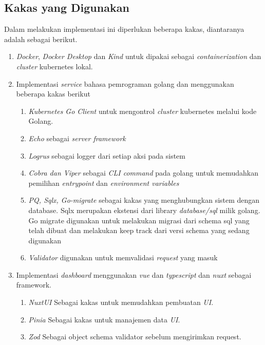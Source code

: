 \subsection{Kakas yang Digunakan}
Dalam melakukan implementasi ini diperlukan beberapa kakas, diantaranya adalah sebagai berikut.
\begin{enumerate}
  \item \textit{Docker}, \textit{Docker Desktop} dan \textit{Kind} untuk dipakai sebagai \textit{containerization} dan \textit{cluster} kubernetes lokal.
  \item Implementasi \textit{service} bahasa pemrograman golang dan menggunakan beberapa kakas berikut
        \begin{enumerate}
          \item \textit{Kubernetes Go Client} untuk mengontrol \textit{cluster} kubernetes melalui kode Golang.
          \item \textit{Echo} sebagai \textit{server framework}
          \item \textit{Logrus} sebagai logger dari setiap aksi pada sistem
          \item \textit{Cobra dan Viper} sebagai \textit{CLI command} pada golang untuk memudahkan pemilihan \textit{entrypoint} dan \textit{environment variables}
          \item \textit{PQ, Sqlx, Go-migrate} sebagai kakas yang menghubungkan sistem dengan database. Sqlx merupakan ekstensi dari library \textit{database/sql} milik golang. Go migrate digunakan untuk melakukan migrasi dari schema sql yang telah dibuat dan melakukan keep track dari versi schema yang sedang digunakan
          \item \textit{Validator} digunakan untuk memvalidasi \textit{request} yang masuk
        \end{enumerate}

  \item Implementasi \textit{dashboard} menggunakan \textit{vue} dan \textit{typescript} dan \textit{nuxt} sebagai framework.
        \begin{enumerate}
          \item \textit{NuxtUI} Sebagai kakas untuk memudahkan pembuatan \textit{UI}.
          \item \textit{Pinia} Sebagai kakas untuk manajemen data \textit{UI}.
          \item \textit{Zod} Sebagai object schema validator sebelum mengirimkan request.
        \end{enumerate}
\end{enumerate}